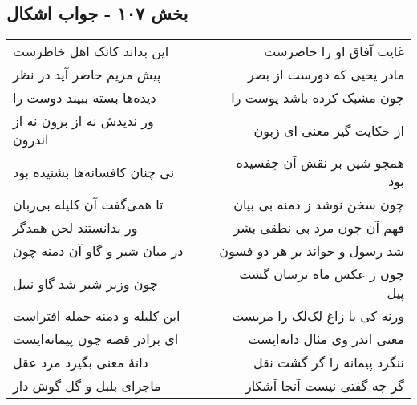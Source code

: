\begin{center}
\section*{بخش ۱۰۷ - جواب اشکال}
\label{sec:sh107}
\begin{longtable}{l p{0.5cm} r}
این بداند کانک اهل خاطرست
&&
غایب آفاق او را حاضرست
\\
پیش مریم حاضر آید در نظر
&&
مادر یحیی که دورست از بصر
\\
دیده‌ها بسته ببیند دوست را
&&
چون مشبک کرده باشد پوست را
\\
ور ندیدش نه از برون نه از اندرون
&&
از حکایت گیر معنی ای زبون
\\
نی چنان کافسانه‌ها بشنیده بود
&&
همچو شین بر نقش آن چفسیده بود
\\
تا همی‌گفت آن کلیله بی‌زبان
&&
چون سخن نوشد ز دمنه بی بیان
\\
ور بدانستند لحن همدگر
&&
فهم آن چون مرد بی نطقی بشر
\\
در میان شیر و گاو آن دمنه چون
&&
شد رسول و خواند بر هر دو فسون
\\
چون وزیر شیر شد گاو نبیل
&&
چون ز عکس ماه ترسان گشت پیل
\\
این کلیله و دمنه جمله افتراست
&&
ورنه کی با زاغ لک‌لک را مریست
\\
ای برادر قصه چون پیمانه‌ایست
&&
معنی اندر وی مثال دانه‌ایست
\\
دانهٔ معنی بگیرد مرد عقل
&&
ننگرد پیمانه را گر گشت نقل
\\
ماجرای بلبل و گل گوش دار
&&
گر چه گفتی نیست آنجا آشکار
\\
\end{longtable}
\end{center}
